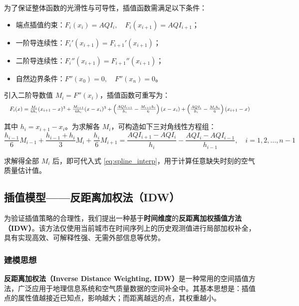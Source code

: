 \documentclass[a4paper,12pt]{article}
\begin{document}
为了保证整体函数的光滑性与可导性，插值函数需满足以下条件：
\begin{itemize}
	\item 端点插值约束：$F_i(x_i) = AQI_i, \quad F_i(x_{i+1}) = AQI_{i+1}$；
	\item 一阶导连续性：$F_i'(x_{i+1}) = F_{i+1}'(x_{i+1})$；
	\item 二阶导连续性：$F_i''(x_{i+1}) = F_{i+1}''(x_{i+1})$；
	\item 自然边界条件：$F''(x_0) = 0, \quad F''(x_n) = 0$。
\end{itemize}

引入二阶导数值 $M_i = F''(x_i)$，插值函数可重写为：
\begin{equation}
	\resizebox{\textwidth}{!}{$
		F_i(x) = \frac{M_i}{6h_i}(x_{i+1} - x)^3 + \frac{M_{i+1}}{6h_i}(x - x_i)^3 
		+ \left(\frac{AQI_{i+1}}{h_i} - \frac{M_{i+1} h_i}{6} \right)(x - x_i) 
		+ \left(\frac{AQI_i}{h_i} - \frac{M_i h_i}{6} \right)(x_{i+1} - x)
		$}
	\label{eq:spline_interp}
\end{equation}

其中 $h_i = x_{i+1} - x_i$。为求解各 $M_i$，可构造如下三对角线性方程组：
\begin{equation}
	\frac{h_{i-1}}{6}M_{i-1} + \frac{h_{i-1} + h_i}{3}M_i + \frac{h_i}{6}M_{i+1} 
	= \frac{AQI_{i+1} - AQI_i}{h_i} - \frac{AQI_i - AQI_{i-1}}{h_{i-1}}, \quad i = 1,2,\dots,n-1
	\label{eq:tridiagonal_spline}
\end{equation}

求解得全部 $M_i$ 后，即可代入式 \eqref{eq:spline_interp}，用于计算任意缺失时刻的空气质量估计值。
	
	\subsection{插值模型——反距离加权法（IDW）}
	
	为验证插值策略的合理性，我们提出一种基于\textbf{时间维度}的\textbf{反距离加权插值方法（IDW）}。该方法仅使用当前城市在时间序列上的历史观测值进行局部加权补全，具有实现高效、可解释性强、无需外部信息等优势。
	
	\subsubsection{建模思想}
	
	\textbf{反距离加权法（Inverse Distance Weighting, IDW）}是一种常用的空间插值方法，广泛应用于地理信息系统和空气质量数据的空间补全中。其基本思想是：插值点的属性值越接近已知点，影响越大；而距离越远的点，其权重越小。
	
\end{document}
